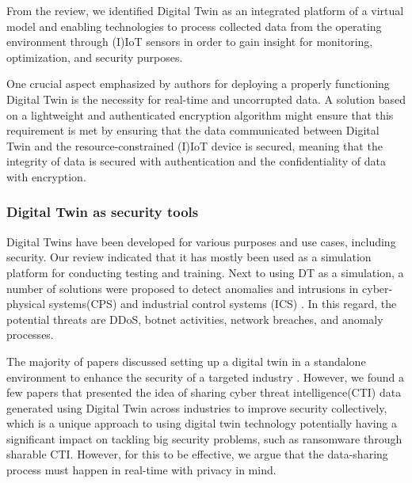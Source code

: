 From the review, we identified Digital Twin as an integrated platform of a virtual model and enabling technologies to process collected data from the operating environment through (I)IoT sensors in order to gain insight for monitoring, optimization, and security purposes. 

One crucial aspect emphasized by authors for deploying a properly functioning Digital Twin is the necessity for real-time and uncorrupted data. A solution based on a lightweight and authenticated encryption algorithm might ensure that this requirement is met by ensuring that the data communicated between Digital Twin and the resource-constrained (I)IoT device is secured, meaning that the integrity of data is secured with authentication and the confidentiality of data with encryption.



\subsubsection*{Digital Twin as security tools}
Digital Twins have been developed for various purposes and use cases, including security. Our review indicated that it has mostly been used as a simulation platform for conducting testing and training. Next to using DT as a simulation, a number of solutions were proposed to detect anomalies \cite{chukkapalliCyberPhysicalSystemSecurity2021} and intrusions in cyber-physical systems(CPS) and industrial control systems (ICS) \cite{vargheseDigitalTwinbasedIntrusion2022, akbarianIntrusionDetectionDigital2020}. In this regard, the potential threats are DDoS, botnet activities, network breaches, and anomaly processes.   


The majority of papers discussed setting up a digital twin in a standalone environment to enhance the security of a targeted industry \cite{almeaibedDigitalTwinAnalysis2021, veledarDigitalTwinsDependability2019, chukkapalliCyberPhysicalSystemSecurity2021, adrienbacueDigitalTwinsEnhanced2022}. However, we found a few papers that presented the idea of sharing cyber threat intelligence(CTI) \cite{dietzHarnessingDigitalTwin2022, almeaibedDigitalTwinAnalysis2021} data generated using Digital Twin across industries to improve security collectively, which is a unique approach to using digital twin technology potentially having a significant impact on tackling big security problems, such as ransomware through sharable CTI. However, for this to be effective, we argue that the data-sharing process must happen in real-time with privacy in mind. 


